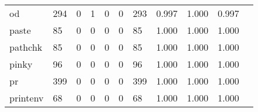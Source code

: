 \begin{longtable}{lp{1.2cm}p{1.2cm}p{1.2cm}p{1.2cm}p{1.2cm}p{1.2cm}p{1.2cm}p{1.2cm}p{1.2cm}p{1.2cm}}
od        &                                   294 &                                                  0 &                                                  1 &                                                  0 &                                                  0 &                                                293 &                                              0.997 &                                              1.000 &                                              0.997 \\
paste     &                                    85 &                                                  0 &                                                  0 &                                                  0 &                                                  0 &                                                 85 &                                              1.000 &                                              1.000 &                                              1.000 \\
pathchk   &                                    85 &                                                  0 &                                                  0 &                                                  0 &                                                  0 &                                                 85 &                                              1.000 &                                              1.000 &                                              1.000 \\
pinky     &                                    96 &                                                  0 &                                                  0 &                                                  0 &                                                  0 &                                                 96 &                                              1.000 &                                              1.000 &                                              1.000 \\
pr        &                                   399 &                                                  0 &                                                  0 &                                                  0 &                                                  0 &                                                399 &                                              1.000 &                                              1.000 &                                              1.000 \\
printenv  &                                    68 &                                                  0 &                                                  0 &                                                  0 &                                                  0 &                                                 68 &                                              1.000 &                                              1.000 &                                              1.000 \\

\end{longtable}
